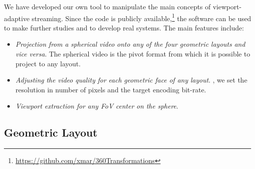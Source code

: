 We have developed our own tool to manipulate the main
concepts of viewport-adaptive streaming. Since the code is publicly
available,\footnote{\url{https://github.com/xmar/360Transformations}}
the software can be used to make further studies and to
develop real systems. The main features include:
\begin{itemize}
  \item \emph{Projection from a spherical video onto any of the four geometric
layouts and vice versa}. The spherical video is the pivot format from
which it is possible to project to any layout.

  \item \emph{Adjusting the video quality for each
geometric face of any layout}. , we set the resolution in
number of pixels and the target encoding bit-rate.

  \item \emph{Viewport extraction for any
\ac{FoV} center on the sphere}. 
\end{itemize}

\subsection{Geometric Layout}

